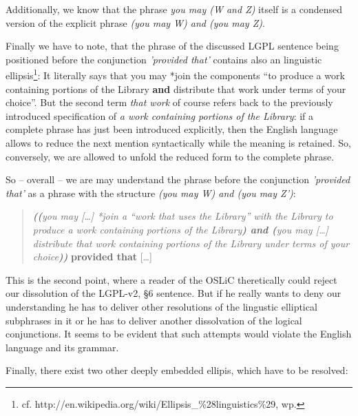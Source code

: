 Additionally, we know that the phrase \emph{you may (W and Z)} itself is a
condensed version of the explicit phrase \emph{ (you may W) and (you may Z)}.

Finally we have to note, that the phrase of the discussed LGPL sentence being
positioned before the conjunction \emph{'provided that'} contains also an
linguistic ellipsis\footnote{cf.
http://en.wikipedia.org/wiki/Ellipsis\_\%28linguistics\%29, wp.
}: It literally says that you may *join the components \enquote{to produce a
work containing portions of the Library \textbf{and} distribute that work under
terms of your choice}. But the second term \emph{that work} of course refers
back to the previously introduced specification of \emph{a work containing
portions of the Library}: if a complete phrase has just been introduced
explicitly, then the English language allows to reduce the next mention
syntactically while the meaning is retained. So, conversely, we are allowed to
unfold the reduced form to the complete phrase.

So -- overall -- we are may understand the phrase before the conjunction
\emph{'provided that'} as a phrase with the structure \emph{(you may W) and (you
may Z')}:

\begin{quote}\noindent\emph{\textbf{((}you may [\ldots] \emph{*join} a
\enquote{work that uses the Library} with the Library to produce a work
containing portions of the Library\textbf{) and (}you may [\ldots] distribute
that work containing portions of the Library under terms of your
choice\textbf{))}} \textbf{provided that} [\ldots]\end{quote}

This is the second point, where a reader of the OSLiC theretically could reject
our  dissolution of the LGPL-v2, §6 sentence. But if he really wants to deny our
understanding he has to deliver other resolutions of the lingustic elliptical
subphrases in it or he has to deliver another dissolvation of the logical
conjunctions. It seems to be evident that such attempts would violate the
English language and its grammar.

Finally, there exist two other deeply embedded ellipis, which have to be
resolved:

